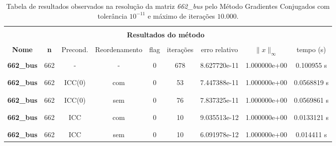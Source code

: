 \begin{table}[ht]
    \centering
    \begin{tabular}{|c|c|c|c|c|c|c|c|c|}
        \hline \rowcolor{Gray}
        \multicolumn{9}{|c|}{\bfseries Tabela do Método dos Gradientes Conjugados com tolerância $10^{-11}$ e máximo de iterações $10.000$ }\\
        \hline \rowcolor{Gray}  \multicolumn{2}{|c|}{} & \multicolumn{7}{|c|}{} \\
         [-1em]  \rowcolor{Gray}
         \multicolumn{2}{|c|}{\bfseries Informações da matriz } & \multicolumn{7}{|c|}{\bfseries Resultados do método }\\
         \hline \rowcolor{Gray} & & & & & & & & \\
         [-1em]
         \rowcolor{Gray}
         \bfseries Nome & \bfseries n & Precond. & Reordenamento & flag & iterações &
         erro relativo &
         $\|x\|_\infty$  & tempo (s) \\
         \hline & & & & & & & & \\
         [-1em] \bfseries 662\_bus & 662 & - & - & 0 & 678 & 8.627720e-11 & 1.000000e+00 & 0.100955 s \\ & & & & & & \\ [-1em] \hline \\
         [-1em] \bfseries 662\_bus & 662 & ICC(0) & com & 0 & 53 & 7.447388e-11 & 1.000000e+00 & 0.0568819 s \\ & & & & & & & & \\ [-1em] \hline \\
         [-1em] \bfseries 662\_bus & 662 & ICC(0) & sem & 0 & 76 & 7.837325e-11 & 1.000000e+00 & 0.0569861 s \\ & & & & & & & &  \\ [-1em] \hline \\
         [-1em] \bfseries 662\_bus & 662 & ICC & com & 0 & 10 & 9.035513e-12 & 1.000000e+00 & 0.0133121 s \\ & & & & & & & & \\ [-1em] \hline \\
         [-1em] \bfseries 662\_bus & 662 & ICC & sem & 0 & 10 & 6.091978e-12 & 1.000000e+00 & 0.014411 s \\ \hline
    \end{tabular}
    \caption{Tabela de resultados observados na resolução da matriz \textit{662\_bus} pelo Método Gradientes Conjugados com tolerância $10^{-11}$ e máximo de iterações $10.000$.}
    \label{tab:resultados-bus}
\end{table}